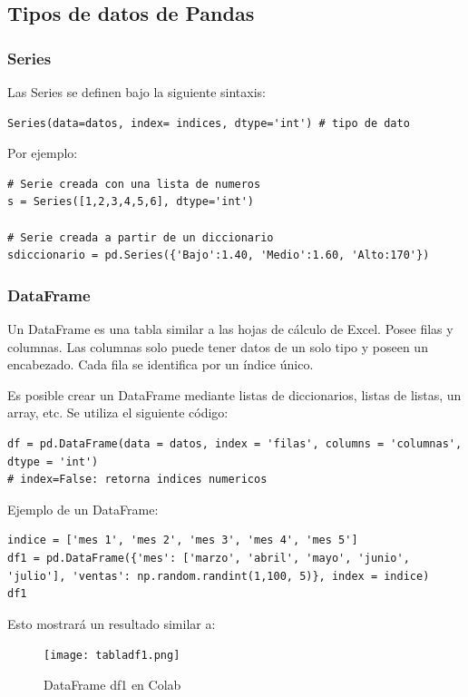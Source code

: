 \documentclass[a4paper, 12pt]{book}
\begin{document}
\subsection{Tipos de datos de Pandas}
\subsubsection{Series}
Las Series se definen bajo la siguiente sintaxis:
\begin{verbatim}
Series(data=datos, index= indices, dtype='int') # tipo de dato
\end{verbatim}

Por ejemplo:
\begin{verbatim}
# Serie creada con una lista de numeros
s = Series([1,2,3,4,5,6], dtype='int')

# Serie creada a partir de un diccionario
sdiccionario = pd.Series({'Bajo':1.40, 'Medio':1.60, 'Alto:170'})
\end{verbatim}

\subsubsection{DataFrame}
Un DataFrame es una tabla similar a las hojas de cálculo de Excel. Posee filas y columnas. Las columnas solo puede tener datos de un solo tipo y poseen un encabezado. Cada fila se identifica por un índice único.

Es posible crear un DataFrame mediante listas de diccionarios, listas de listas, un array, etc. Se utiliza el siguiente código:
\begin{verbatim}
df = pd.DataFrame(data = datos, index = 'filas', columns = 'columnas', dtype = 'int')
# index=False: retorna indices numericos
\end{verbatim}

Ejemplo de un DataFrame:
\begin{verbatim}
indice = ['mes 1', 'mes 2', 'mes 3', 'mes 4', 'mes 5']
df1 = pd.DataFrame({'mes': ['marzo', 'abril', 'mayo', 'junio', 'julio'], 'ventas': np.random.randint(1,100, 5)}, index = indice)
df1
\end{verbatim}
Esto mostrará un resultado similar a:
\begin{figure}[H] 
	\centering 
	\texttt{[image: tabladf1.png]}
	\caption{DataFrame df1 en Colab}
\end{figure}
\end{document}
